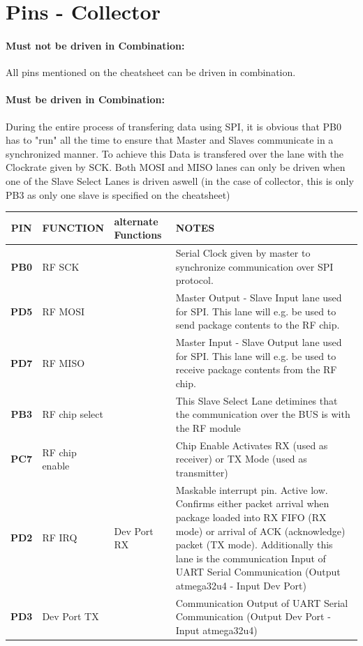 \documentclass[12pt]{article}
\begin{document}
\vspace{1cm}

\newpage
\section*{Pins - Collector}


\paragraph{Must not be driven in Combination:}
All pins mentioned on the cheatsheet can be driven in combination.

\paragraph{Must be driven in Combination:}
During the entire process of transfering data using SPI, it is obvious that PB0 has to "run" all the time to ensure that Master and Slaves communicate in a  synchronized manner. To achieve this Data is transfered over the lane with the Clockrate given by SCK. Both MOSI and MISO lanes can only be driven when one of the Slave Select Lanes is driven aswell (in the case of collector, this is only PB3 as only one slave is specified on the cheatsheet)\\

\small
\begin{tabular}{| c || p{30mm} | p{30mm} | p{60mm} |}
  \hline
  \textbf{PIN} & FUNCTION & alternate Functions & NOTES\\
  \hline
  \hline
  \textbf{PB0} & RF SCK &  & Serial Clock given by master to synchronize communication over SPI protocol. \\
  \hline
  \textbf{PD5} & RF MOSI &  & Master Output - Slave Input lane used for SPI. This lane will e.g. be used to send package contents to the RF chip.\\
  \hline
  \textbf{PD7} & RF MISO &  & Master Input - Slave Output lane used for SPI. This lane will e.g. be used to receive package contents from the RF chip.\\
  \hline
  \textbf{PB3} & RF chip select &  & This Slave Select Lane detimines that the communication over the BUS is with the RF module\\
  \hline
  \textbf{PC7} & RF chip enable &  & Chip Enable Activates RX (used as receiver) or TX Mode (used as transmitter) \\
  \hline
  \textbf{PD2} & RF IRQ & Dev Port RX & Maskable interrupt pin. Active low. Confirms either packet arrival when package loaded into RX FIFO (RX mode) or arrival of ACK (acknowledge) packet (TX mode). Additionally this lane is the communication Input of UART Serial Communication (Output atmega32u4 - Input Dev Port) \\
  \hline
  \textbf{PD3} & Dev Port TX &  & Communication Output of UART Serial Communication (Output Dev Port - Input atmega32u4) \\
  \hline
\end{tabular}
\normalsize
\end{document}

